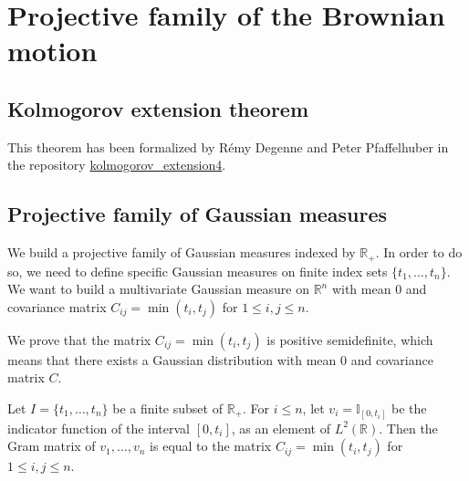 \chapter{Projective family of the Brownian motion}
\label{chap:projective_family}


\section{Kolmogorov extension theorem}

This theorem has been formalized by Rémy Degenne and Peter Pfaffelhuber in the repository \href{https://github.com/RemyDegenne/kolmogorov_extension4}{kolmogorov\_extension4}.









\section{Projective family of Gaussian measures}

We build a projective family of Gaussian measures indexed by $\mathbb{R}_+$.
In order to do so, we need to define specific Gaussian measures on finite index sets $\{t_1, \ldots, t_n\}$.
We want to build a multivariate Gaussian measure on $\mathbb{R}^n$ with mean $0$ and covariance matrix $C_{ij} = \min(t_i, t_j)$ for $1 \leq i,j \leq n$.

We prove that the matrix $C_{ij} = \min(t_i, t_j)$ is positive semidefinite, which means that there exists a Gaussian distribution with mean 0 and covariance matrix $C$.







\begin{lemma}\label{lem:C_eq_gramMatrix}
  \leanok
Let $I = \{t_1, \ldots, t_n\}$ be a finite subset of $\mathbb{R}_+$.
For $i \le n$, let $v_i = \mathbb{I}_{[0, t_i]}$ be the indicator function of the interval $[0, t_i]$, as an element of $L^2(\mathbb{R})$.
Then the Gram matrix of $v_1, \ldots, v_n$ is equal to the matrix $C_{ij} = \min(t_i, t_j)$ for $1 \leq i,j \leq n$.
\end{lemma}

